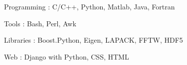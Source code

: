 


\begin{cvskills}


\cvskill
{Programming : } %
{C/C++, Python, Matlab, Java, Fortran} %

\cvskill
{Tools : }
{Bash, Perl, Awk}

\cvskill
{Libraries : }
{Boost.Python, Eigen, LAPACK, FFTW, HDF5}


\cvskill
{Web : } %
{Django with Python, CSS, HTML} %




\end{cvskills}